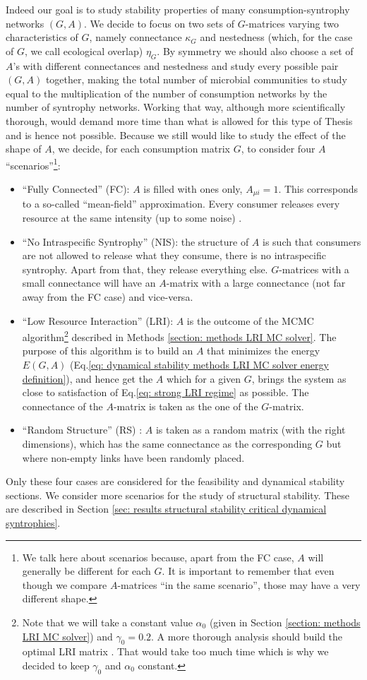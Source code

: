 \documentclass[12pt]{report}
\begin{document}
Indeed our goal is to study stability properties of many consumption-syntrophy networks $(G,A)$. We decide to focus on two sets of $G$-matrices varying two characteristics of $G$, namely connectance $\kappa_G$ and nestedness (which, for the case of $G$, we call ecological overlap) $\eta_G$. By symmetry we should also choose a set of $A$'s with different connectances and nestedness and study every possible pair $(G,A)$ together, making the total number of microbial communities to study equal to the multiplication of the number of consumption networks by the number of syntrophy networks. Working that way, although more scientifically thorough, would demand more time than what is allowed for this type of Thesis and is hence not possible. Because we still would like to study the effect of the shape of $A$, we decide, for each consumption matrix $G$, to consider four $A$ ``scenarios''\footnote{We talk here about scenarios because, apart from the FC case, $A$ will generally be different for each $G$. It is important to remember that even though we compare $A$-matrices ``in the same scenario'', those may have a very different shape.}:
\begin{itemize}
  \item ``Fully Connected'' (FC): $A$ is filled with ones only, $A_{\mu i}=1$. This corresponds to a so-called ``mean-field'' approximation. Every consumer releases every resource at the same intensity (up to some noise) .
  \item ``No Intraspecific Syntrophy'' (NIS): the structure of $A$ is such that consumers are not allowed to release what they consume, \ie there is no intraspecific syntrophy. Apart from that, they release everything else. $G$-matrices with a small connectance will have an $A$-matrix with a large connectance (not far away from the FC case) and vice-versa.
  \item ``Low Resource Interaction'' (LRI): $A$ is the outcome of the MCMC algorithm\footnote{Note that we will take a constant value $\alpha_0$ (given in Section \ref{section: methods LRI MC solver}) and $\gamma_0=0.2$. A more thorough analysis should build the optimal LRI matrix . That would take too much time which is why we decided to keep $\gamma_0$ and $\alpha_0$ constant.}
 described in Methods \ref{section: methods LRI MC solver}. The purpose of this algorithm is to build an $A$ that minimizes the energy $E(G,A)$ (Eq.\ref{eq: dynamical stability methods LRI MC solver energy definition}), and hence get the $A$ which for a given $G$, brings the system as close to satisfaction of Eq.\eqref{eq: strong LRI regime} as possible. The connectance of the $A$-matrix is taken as the one of the $G$-matrix.
 \item ``Random Structure'' (RS) : $A$ is taken as a random matrix (with the right dimensions), which has the same connectance as the corresponding $G$ but where non-empty links have been randomly placed.
 \end{itemize}
Only these four cases are considered for the feasibility and dynamical stability sections. We consider more scenarios for the study of structural stability. These are described in Section \ref{sec: results structural stability critical dynamical syntrophies}.
\end{document}
